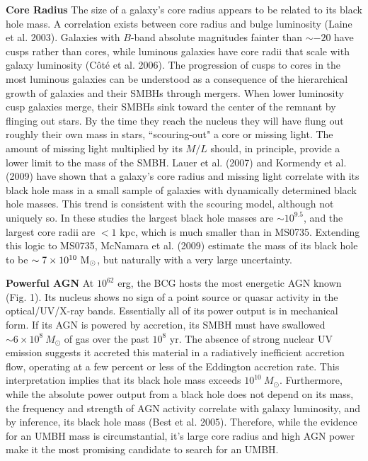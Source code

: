 \documentclass[12pt]{article}
\begin{document}
{\bf Core Radius}  The size of a galaxy's core radius appears to be related to its black hole mass.  A correlation exists between core radius and bulge luminosity (Laine et al. 2003).  Galaxies with  $B$-band absolute magnitudes fainter than $\sim -20$ have cusps rather than cores, while luminous galaxies have core radii that scale with galaxy luminosity (C\^ot\'e et al. 2006).  The progression of cusps to cores in the most luminous galaxies can be understood as a consequence of the hierarchical growth of  galaxies and their SMBHs through mergers.   When lower luminosity cusp galaxies merge, 
their SMBHs sink toward the center of the remnant by flinging out stars.  By the time they reach the nucleus they will have flung out roughly their own mass in stars, ``scouring-out" a core or missing light.  The amount of missing light multiplied by its $M/L$ should, in principle, provide a lower limit to the mass of the SMBH.   Lauer et al. (2007) and Kormendy et al. (2009) have shown that a galaxy's core radius  and missing light correlate with its black hole mass in a small sample of galaxies with dynamically determined black hole masses.  This trend is consistent with the scouring model, although not uniquely so.    In these studies the largest black hole masses are $\sim 10^{9.5}$, and the largest core radii  are
$< 1$ kpc, which is much smaller than in MS0735. Extending this logic to MS0735, McNamara et al. (2009) estimate the mass of its black hole to be
$\sim 7\times 10^{10}~\rm M_\odot$, but naturally with a very large uncertainty.

{\bf Powerful AGN} At $10^{62}$ erg, the BCG hosts the most energetic AGN known (Fig. 1). Its nucleus shows no sign of a point source or quasar activity in the optical/UV/X-ray bands.  Essentially all of its power output is in mechanical form.  If its AGN is powered by accretion, its SMBH must have swallowed $\sim 6\times 10^8~ M_\odot$ of gas over the past $10^8$ yr.  The absence of strong nuclear UV emission suggests it accreted this material in a radiatively inefficient accretion flow, operating at a few percent or less of the Eddington accretion rate.   This interpretation implies that its black hole mass exceeds $10^{10}~ M_\odot$.  Furthermore, while the absolute power output from a black hole does not depend on its mass, the frequency and strength of AGN activity 
correlate with galaxy luminosity, and by inference, its black hole mass (Best et al.  2005).  Therefore, while the evidence for an UMBH mass is circumstantial, it's large core radius and high AGN power make it the most promising candidate to search for an UMBH.  
\end{document}
